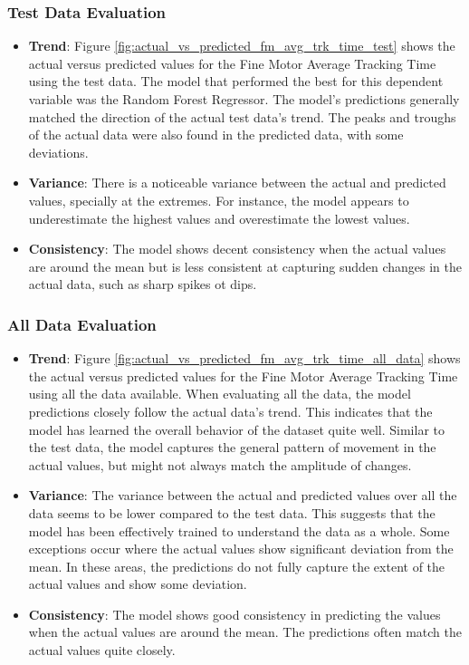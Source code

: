 \subsubsection*{Test Data Evaluation}

\begin{itemize}
    \item \textbf{Trend}: Figure \ref{fig:actual_vs_predicted_fm_avg_trk_time_test} shows the actual versus predicted values for the Fine Motor Average Tracking Time using the test data. The model that performed 
    the best for this dependent variable was the Random Forest Regressor. The model's predictions generally matched the direction of the actual test data's trend. The peaks and troughs of the
    actual data were also found in the predicted data, with some deviations. 
    \item \textbf{Variance}: There is a noticeable variance between the actual and predicted values, specially at the extremes. For instance, the model appears to underestimate the highest values
    and overestimate the lowest values.
    \item \textbf{Consistency}: The model shows decent consistency when the actual values are around the mean but is less consistent at capturing sudden changes in the actual data, such as sharp spikes ot dips.
\end{itemize}

\subsubsection*{All Data Evaluation}

\begin{itemize}
    \item \textbf{Trend}: Figure \ref{fig:actual_vs_predicted_fm_avg_trk_time_all_data} shows the actual versus predicted values for the Fine Motor Average Tracking Time using all the data
    available. When evaluating all the data, the model predictions closely follow the actual data's trend. This indicates that the model has learned the overall behavior of the dataset quite well.
    Similar to the test data, the model captures the general pattern of movement in the actual values, but might not always match the amplitude of changes.
    \item \textbf{Variance}: The variance between the actual and predicted values over all the data seems to be lower compared to the test data. This suggests that the model has been 
    effectively trained to understand the data as a whole. Some exceptions occur where the actual values show significant deviation from the mean. In these areas, the predictions do not fully 
    capture the extent of the actual values and show some deviation.
    \item \textbf{Consistency}: The model shows good consistency in predicting the values when the actual values are around the mean. The predictions often match the actual values quite closely.
\end{itemize}

